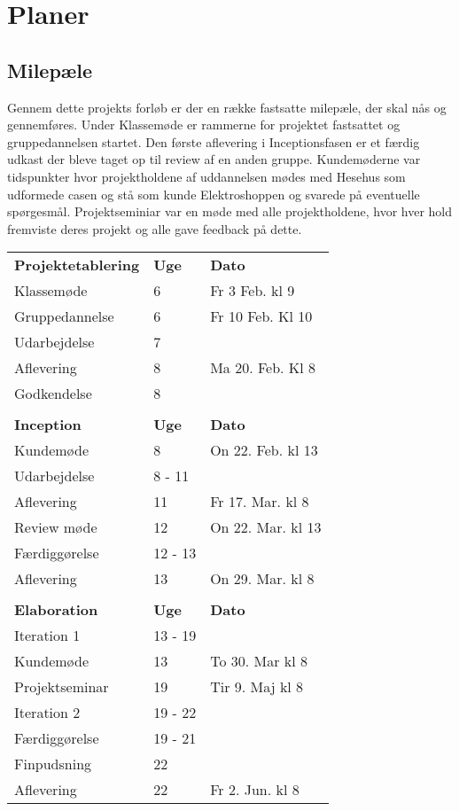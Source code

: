 \twocolumn
\chapter{Planer}
\section{Milepæle}
Gennem dette projekts forløb er der en række fastsatte milepæle, der skal nås og gennemføres. Under Klassemøde er rammerne for projektet fastsattet og gruppedannelsen startet. Den første aflevering i Inceptionsfasen er et færdig udkast der bleve taget op til review af en anden gruppe. Kundemøderne var tidspunkter hvor projektholdene af uddannelsen mødes med Hesehus som udformede casen og stå som kunde Elektroshoppen og svarede på eventuelle spørgesmål. Projektseminiar var en møde med alle projektholdene, hvor hver hold fremviste deres projekt og alle gave feedback på dette.

\hfill \newline \hfill 
	\begin{tabular}{lp{1cm}p{3cm}}
		\textbf{Projektetablering} & \textbf{Uge} & \textbf{Dato} \\
        Klassemøde & 6 & Fr 3 Feb. kl 9 \\
        Gruppedannelse & 6 & Fr 10 Feb. Kl 10 \\
        Udarbejdelse & 7 & \\
        Aflevering & 8 & Ma 20. Feb. Kl 8 \\
        Godkendelse & 8 & \\
        & & \\
        \textbf{Inception} & \textbf{Uge} & \textbf{Dato} \\
        Kundemøde & 8 & On 22. Feb. kl 13 \\
        Udarbejdelse & 8 - 11 & \\ 
        Aflevering & 11 & Fr 17. Mar. kl 8 \\
        Review møde & 12 & On 22. Mar. kl 13 \\
        Færdiggørelse & 12 - 13 & \\ 
        Aflevering & 13 & On 29. Mar. kl 8 \\
        & & \\
        \textbf{Elaboration} & \textbf{Uge} & \textbf{Dato} \\
        Iteration 1 & 13 - 19 & \\
        Kundemøde & 13 & To 30. Mar kl 8 \\
        Projektseminar & 19 & Tir 9. Maj kl 8 \\
        Iteration 2 & 19 - 22 & \\
        Færdiggørelse & 19 - 21 & \\
        Finpudsning & 22 & \\
        Aflevering & 22 & Fr 2. Jun. kl 8 \\
	\end{tabular}
